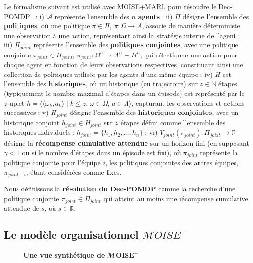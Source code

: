 \documentclass[dissemination]{jfsma}
\begin{document}
Le formalisme suivant est utilisé avec MOISE+MARL pour résoudre le Dec-POMDP~\cite{Beynier2013,Albrecht2024} :  
%
i) \(\mathcal{A}\) représente l'ensemble des \(n\) \textbf{agents}
 ; \quad
ii) \(\Pi\) désigne l'ensemble des \textbf{politiques}, où une politique \(\pi \in \Pi\), \(\pi: \Omega \rightarrow A\), associe de manière déterministe une observation à une action, représentant ainsi la stratégie interne de l'agent
 ; \quad
iii) \(\Pi_{joint}\) représente l'ensemble des \textbf{politiques conjointes}, avec une politique conjointe \(\pi_{joint} \in \Pi_{joint}\), \(\pi_{joint}: \Omega^n \rightarrow A^n = \Pi^n\), qui sélectionne une action pour chaque agent en fonction de leurs observations respectives, constituant ainsi une collection de politiques utilisée par les agents d'une même équipe
 ; \quad
iv) \(H\) est l'ensemble des \textbf{historiques}, où un historique (ou trajectoire) sur \(z \in \mathbb{N}\) étapes (typiquement le nombre maximal d'étapes dans un épisode) est représenté par le \(z\)-uplet $h = \langle \langle \omega_{k}, a_{k}\rangle \mid k \leq z,\, \omega \in \Omega,\, a \in A\rangle$, capturant les observations et actions successives
 ; \quad
v) \(H_{joint}\) désigne l'ensemble des \textbf{historiques conjointes}, avec un historique conjoint \(h_{joint} \in H_{joint}\) sur \(z\) étapes défini comme l'ensemble des historiques individuels : $h_{joint} = \{h_1, h_2, \dots, h_n\}$
; \quad
vi) \(V_{joint}(\pi_{joint}) : \Pi_{joint} \rightarrow \mathbb{R}\) désigne la \textbf{récompense cumulative attendue} sur un horizon fini (en supposant \(\gamma < 1\) ou si le nombre d'étapes dans un épisode est fini), où \(\pi_{joint}\) représente la politique conjointe pour l'équipe \(i\), les politiques conjointes des autres équipes, \(\pi_{joint,-i}\), étant considérées comme fixes.

Nous définissons la \textbf{résolution du Dec-POMDP} comme la recherche d'une politique conjointe \(\pi_{joint} \in \Pi_{joint}\) qui atteint au moins une récompense cumulative attendue de \(s\), où \(s \in \mathbb{R}\).

\subsection{Le modèle organisationnel \(\mathcal{M}OISE^+\)}

\begin{figure}[h!]
    
    \caption{\textbf{Une vue synthétique de} $\mathbfcal{M}\mathbf{OISE^+}$}
    \label{fig:moise_model}
\end{figure}
\end{document}
